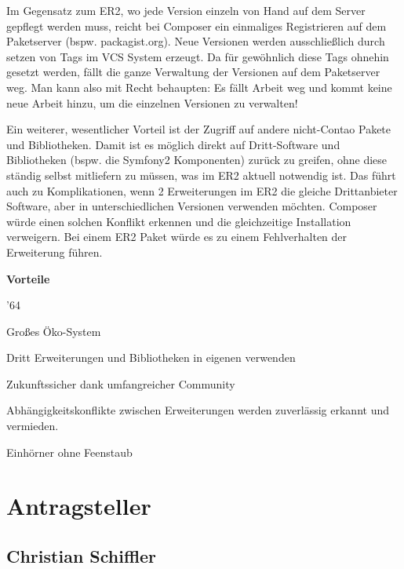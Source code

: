 \documentclass[
paper=a4,
draft=false,%
fontsize=10pt%
]{scrartcl}
\begin{document}
Im Gegensatz zum ER2, wo jede Version einzeln von Hand auf dem Server gepflegt werden muss, reicht bei Composer ein einmaliges Registrieren auf dem Paketserver (bspw. packagist.org). Neue Versionen werden ausschließlich durch setzen von Tags im VCS System erzeugt. Da für gewöhnlich diese Tags ohnehin gesetzt werden, fällt die ganze Verwaltung der Versionen auf dem Paketserver weg. Man kann also mit Recht behaupten: Es fällt Arbeit weg und kommt keine neue Arbeit hinzu, um die einzelnen Versionen zu verwalten!

Ein weiterer, wesentlicher Vorteil ist der Zugriff auf andere nicht-Contao Pakete und Bibliotheken. Damit ist es möglich direkt auf Dritt-Software und Bibliotheken (bspw. die Symfony2 Komponenten) zurück zu greifen, ohne diese ständig selbst mitliefern zu müssen, was im ER2 aktuell notwendig ist. Das führt auch zu Komplikationen, wenn 2 Erweiterungen im ER2 die gleiche Drittanbieter Software, aber in unterschiedlichen Versionen verwenden möchten. Composer würde einen solchen Konflikt erkennen und die gleichzeitige Installation verweigern. Bei einem ER2 Paket würde es zu einem Fehlverhalten der Erweiterung führen.

\textbf{Vorteile}
\begin{dinglist}{'64}
\item Großes Öko-System
\item Dritt Erweiterungen und Bibliotheken in eigenen verwenden
\item Zukunftssicher dank umfangreicher Community
\item Abhängigkeitskonflikte zwischen Erweiterungen werden zuverlässig erkannt und vermieden.
\item Einhörner ohne Feenstaub
\end{dinglist}

%
%

\newpage

\section{Antragsteller}
\label{sec:proposer}

\subsection*{Christian  Schiffler}
\end{document}
